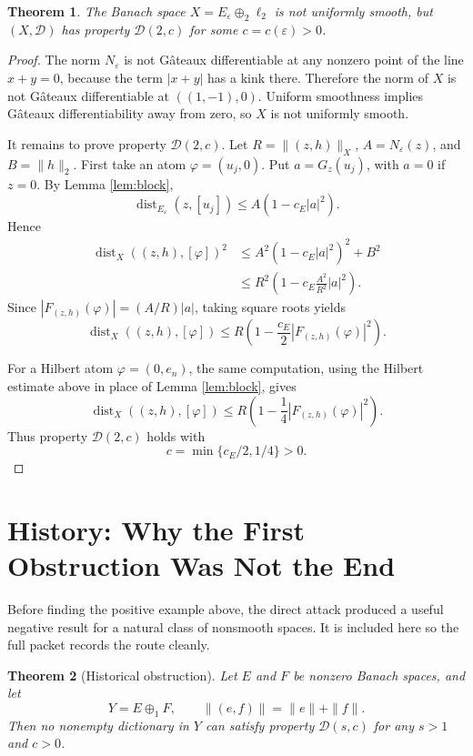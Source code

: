 \documentclass[11pt]{amsart}
\newtheorem{theorem}{Theorem}
\newcommand{\dist}{\operatorname{dist}}
\newcommand{\elltwo}{\ell_2}
\begin{document}
\begin{theorem}
The Banach space \(X=E_\varepsilon\oplus_2\elltwo\) is not uniformly smooth,
but \((X,\mathcal D)\) has property \(\mathcal D(2,c)\) for some
\(c=c(\varepsilon)>0\).
\end{theorem}

\begin{proof}
The norm \(N_\varepsilon\) is not G\^ateaux differentiable at any nonzero
point of the line \(x+y=0\), because the term \(|x+y|\) has a kink there.
Therefore the norm of \(X\) is not G\^ateaux differentiable at
\(((1,-1),0)\). Uniform smoothness implies G\^ateaux differentiability away
from zero, so \(X\) is not uniformly smooth.

It remains to prove property \(\mathcal D(2,c)\). Let \(R=\|(z,h)\|_X\),
\(A=N_\varepsilon(z)\), and \(B=\|h\|_2\). First take an atom
\(\varphi=(u_j,0)\). Put \(a=G_z(u_j)\), with \(a=0\) if \(z=0\). By
Lemma \ref{lem:block},
\[
  \dist_{E_\varepsilon}(z,[u_j])\leq A(1-c_E|a|^2).
\]
Hence
\[
\begin{aligned}
  \dist_X((z,h),[\varphi])^2
  &\leq A^2(1-c_E|a|^2)^2+B^2  \\
  &\leq R^2\left(1-c_E\frac{A^2}{R^2}|a|^2\right).
\end{aligned}
\]
Since \(|F_{(z,h)}(\varphi)|=(A/R)|a|\), taking square roots yields
\[
  \dist_X((z,h),[\varphi])
  \leq R\left(1-\frac{c_E}{2}|F_{(z,h)}(\varphi)|^2\right).
\]

For a Hilbert atom \(\varphi=(0,e_n)\), the same computation, using the
Hilbert estimate above in place of Lemma \ref{lem:block}, gives
\[
  \dist_X((z,h),[\varphi])
  \leq R\left(1-\frac14 |F_{(z,h)}(\varphi)|^2\right).
\]
Thus property \(\mathcal D(2,c)\) holds with
\[
  c=\min\{c_E/2,1/4\}>0.
\]
\end{proof}

\section*{History: Why the First Obstruction Was Not the End}

Before finding the positive example above, the direct attack produced a useful
negative result for a natural class of nonsmooth spaces. It is included here
so the full packet records the route cleanly.

\begin{theorem}[Historical obstruction]
Let \(E\) and \(F\) be nonzero Banach spaces, and let
\[
  Y=E\oplus_1 F,\qquad \|(e,f)\|=\|e\|+\|f\|.
\]
Then no nonempty dictionary in \(Y\) can satisfy property
\(\mathcal D(s,c)\) for any \(s>1\) and \(c>0\).
\end{theorem}
\end{document}
